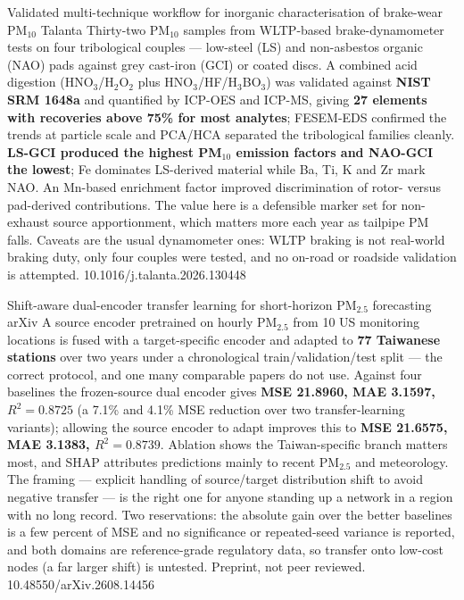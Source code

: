 \documentclass[10pt]{article}
\begin{document}
{Validated multi-technique workflow for inorganic characterisation of brake-wear PM$_{10}$}
{Talanta}
{Thirty-two PM$_{10}$ samples from WLTP-based brake-dynamometer tests on four tribological
couples --- low-steel (LS) and non-asbestos organic (NAO) pads against grey cast-iron (GCI)
or coated discs. A combined acid digestion (HNO$_3$/H$_2$O$_2$ plus
HNO$_3$/HF/H$_3$BO$_3$) was validated against \textbf{NIST SRM 1648a} and quantified by
ICP-OES and ICP-MS, giving \textbf{27 elements with recoveries above 75\% for most
analytes}; FESEM-EDS confirmed the trends at particle scale and PCA/HCA separated the
tribological families cleanly. \textbf{LS-GCI produced the highest PM$_{10}$ emission
factors and NAO-GCI the lowest}; Fe dominates LS-derived material while Ba, Ti, K and Zr
mark NAO. An Mn-based enrichment factor improved discrimination of rotor- versus
pad-derived contributions. The value here is a defensible marker set for non-exhaust source
apportionment, which matters more each year as tailpipe PM falls. Caveats are the usual
dynamometer ones: WLTP braking is not real-world braking duty, only four couples were
tested, and no on-road or roadside validation is attempted.}
{10.1016/j.talanta.2026.130448}

{Shift-aware dual-encoder transfer learning for short-horizon PM$_{2.5}$ forecasting}
{arXiv}
{A source encoder pretrained on hourly PM$_{2.5}$ from 10 US monitoring locations is fused
with a target-specific encoder and adapted to \textbf{77 Taiwanese stations} over two years
under a chronological train/validation/test split --- the correct protocol, and one many
comparable papers do not use. Against four baselines the frozen-source dual encoder gives
\textbf{MSE 21.8960, MAE 3.1597, $R^2 = 0.8725$} (a 7.1\% and 4.1\% MSE reduction over two
transfer-learning variants); allowing the source encoder to adapt improves this to
\textbf{MSE 21.6575, MAE 3.1383, $R^2 = 0.8739$}. Ablation shows the Taiwan-specific branch
matters most, and SHAP attributes predictions mainly to recent PM$_{2.5}$ and meteorology.
The framing --- explicit handling of source/target distribution shift to avoid negative
transfer --- is the right one for anyone standing up a network in a region with no long
record. Two reservations: the absolute gain over the better baselines is a few percent of
MSE and no significance or repeated-seed variance is reported, and both domains are
reference-grade regulatory data, so transfer onto low-cost nodes (a far larger shift) is
untested. Preprint, not peer reviewed.}
{10.48550/arXiv.2608.14456}
\end{document}
